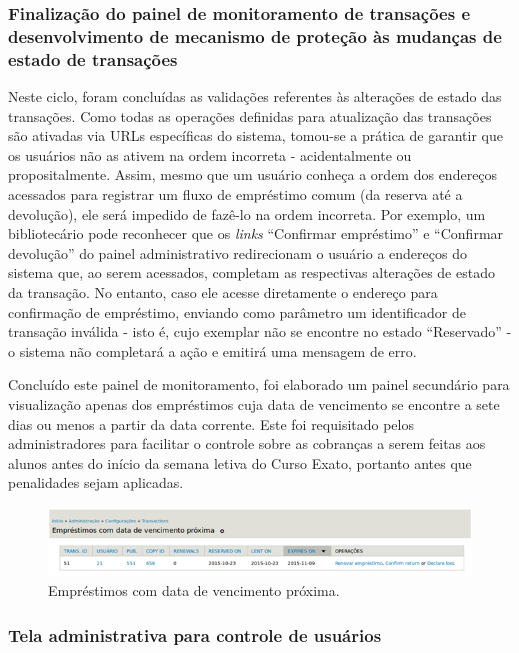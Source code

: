 \documentclass[a4paper]{article}
\begin{document}
\subsubsection{Finalização do painel de monitoramento de transações e desenvolvimento de mecanismo de proteção às mudanças de estado de transações}
    
Neste ciclo, foram concluídas as validações referentes às alterações de estado das transações. Como todas as operações definidas para atualização das transações são ativadas via URLs específicas do sistema, tomou-se a prática de garantir que os usuários não as ativem na ordem incorreta - acidentalmente ou propositalmente. Assim, mesmo que um usuário conheça a ordem dos endereços acessados para registrar um fluxo de empréstimo comum (da reserva até a devolução), ele será impedido de fazê-lo na ordem incorreta. Por exemplo, um bibliotecário pode reconhecer que os \textit{links} “Confirmar empréstimo” e “Confirmar devolução” do painel administrativo redirecionam o usuário a endereços do sistema que, ao serem acessados, completam as respectivas alterações de estado da transação. No entanto, caso ele acesse diretamente o endereço para confirmação de empréstimo, enviando como parâmetro um identificador de transação inválida - isto é, cujo exemplar não se encontre no estado “Reservado” - o sistema não completará a ação e emitirá uma mensagem de erro.

Concluído este painel de monitoramento, foi elaborado um painel secundário para visualização apenas dos empréstimos cuja data de vencimento se encontre a sete dias ou menos a partir da data corrente. Este foi requisitado pelos administradores para facilitar o controle sobre as cobranças a serem feitas aos alunos antes do início da semana letiva do Curso Exato, portanto antes que penalidades sejam aplicadas.

\begin{figure}[pbth!]
\centering
\includegraphics[width=150mm]{img/expiring-soon.png}
\caption{Empréstimos com data de vencimento próxima.\label{expiring-soon}}
\end{figure}

\subsubsection{Tela administrativa para controle de usuários}
\end{document}
